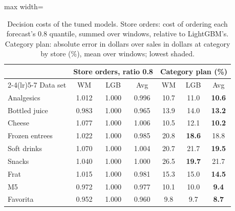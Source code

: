 \begin{table}[t]
\centering\footnotesize\setlength{\tabcolsep}{3pt}
\caption{Decision costs of the tuned models. Store orders: cost of ordering each forecast's 0.8 quantile, summed over
windows, relative to LightGBM's. Category plan: absolute error in dollars over sales in dollars at category by store
(\%), mean over windows; lowest shaded.}
\label{tab:sup-decisions}
\begin{adjustbox}{max width=\columnwidth}\begin{tabular}{lcccccc}
\toprule
 & \multicolumn{3}{c}{Store orders, ratio 0.8} & \multicolumn{3}{c}{Category plan (\%)}\\
\cmidrule(lr){2-4}\cmidrule(lr){5-7}
Data set & WM & LGB & Avg & WM & LGB & Avg\\
\midrule
Analgesics & 1.012 & 1.000 & 0.996 & 10.7 & 11.0 & \cellcolor{avgcell}\textbf{10.6} \\
Bottled juice & 0.983 & 1.000 & 0.965 & 13.9 & 14.0 & \cellcolor{avgcell}\textbf{13.2} \\
Cheese & 1.077 & 1.000 & 1.006 & 10.5 & 12.1 & \cellcolor{avgcell}\textbf{10.2} \\
Frozen entrees & 1.022 & 1.000 & 0.985 & 20.8 & \cellcolor{lgbcell}\textbf{18.6} & 18.8 \\
Soft drinks & 1.070 & 1.000 & 1.004 & 20.7 & 21.7 & \cellcolor{avgcell}\textbf{19.5} \\
Snacks & 1.040 & 1.000 & 1.000 & 26.5 & \cellcolor{lgbcell}\textbf{19.7} & 21.7 \\
Frat & 1.015 & 1.000 & 0.981 & 15.3 & 15.0 & \cellcolor{avgcell}\textbf{14.5} \\
M5 & 0.972 & 1.000 & 0.977 & 10.1 & 10.0 & \cellcolor{avgcell}\textbf{9.4} \\
Favorita & 0.952 & 1.000 & 0.960 & 9.8 & 9.7 & \cellcolor{avgcell}\textbf{8.7} \\
\bottomrule
\end{tabular}\end{adjustbox}
\end{table}
